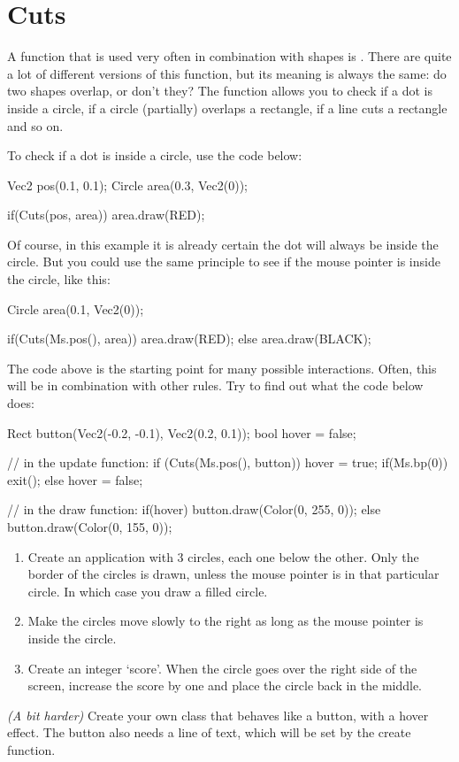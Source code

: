 \section{Cuts}

A function that is used very often in combination with shapes is . There are quite a lot of different versions of this function, but its meaning is always the same: do two shapes overlap, or don't they? The  function allows you to check if a dot is inside a circle, if a circle (partially) overlaps a rectangle, if a line cuts a rectangle and so on. 

To check if a dot is inside a circle, use the code below:

\begin{code}
Vec2 pos(0.1, 0.1);
Circle area(0.3, Vec2(0));

if(Cuts(pos, area)) area.draw(RED);
\end{code}

Of course, in this example it is already certain the dot will always be inside the circle. But you could use the same principle to see if the mouse pointer is inside the circle, like this:

\begin{code}
Circle area(0.1, Vec2(0));

if(Cuts(Ms.pos(), area)) area.draw(RED);
else area.draw(BLACK);
\end{code}

The code above is the starting point for many possible interactions. Often, this will be in combination with other rules. Try to find out what the code below does:

\begin{code}
Rect button(Vec2(-0.2, -0.1), Vec2(0.2, 0.1));
bool hover = false;

// in the update function:
if (Cuts(Ms.pos(), button)) {
    hover = true;
	if(Ms.bp(0)) exit();
} else hover = false;

// in the draw function:
if(hover) {
  button.draw(Color(0, 255, 0));
} else {
  button.draw(Color(0, 155, 0));
}
\end{code}

\begin{exercise}
\begin{enumerate}
\item Create an application with 3 circles, each one below the other. Only the border of the circles is drawn, unless the mouse pointer is in that particular circle. In which case you draw a filled circle.
\item Make the circles move slowly to the right as long as the mouse pointer is inside the circle.
\item Create an integer `score'. When the circle goes over the right side of the screen, increase the score by one and place the circle back in the middle.
\end{enumerate}

\textit{(A bit harder) } Create your own class that behaves like a button, with a hover effect. The button also needs a line of text, which will be set by the create function.
\end{exercise}



